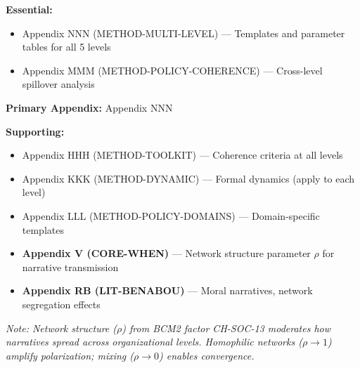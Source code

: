 \begin{tcolorbox}[colback=yellow!10!white, colframe=orange!75!black, title=Appendix References for This Chapter]

\textbf{Essential:}
\begin{itemize}[nosep]
\item Appendix NNN (METHOD-MULTI-LEVEL) --- Templates and parameter tables for all 5 levels
\item Appendix MMM (METHOD-POLICY-COHERENCE) --- Cross-level spillover analysis
\end{itemize}

\textbf{Primary Appendix:} Appendix NNN

\textbf{Supporting:}
\begin{itemize}[nosep]
\item Appendix HHH (METHOD-TOOLKIT) --- Coherence criteria at all levels
\item Appendix KKK (METHOD-DYNAMIC) --- Formal dynamics (apply to each level)
\item Appendix LLL (METHOD-POLICY-DOMAINS) --- Domain-specific templates
\item \textbf{Appendix V (CORE-WHEN)} --- Network structure parameter $\rho$ for narrative transmission
\item \textbf{Appendix RB (LIT-BENABOU)} --- Moral narratives, network segregation effects
\end{itemize}

\textit{Note: Network structure ($\rho$) from BCM2 factor CH-SOC-13 moderates how narratives spread across organizational levels. Homophilic networks ($\rho \to 1$) amplify polarization; mixing ($\rho \to 0$) enables convergence.}

\end{tcolorbox}

